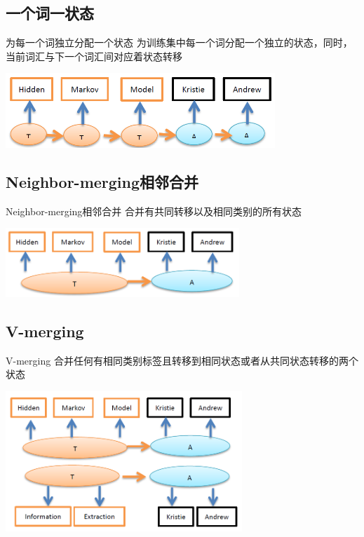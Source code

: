 \documentclass{beamer}
\begin{document}
\subsection{一个词一状态}
\begin{frame}{为每一个词独立分配一个状态}
    为训练集中每一个词分配一个独立的状态，同时，当前词汇与下一个词汇间对应着状态转移
    \begin{center}
        \includegraphics[height=80pt]{report5/neighbor-1.png}
    \end{center}
\end{frame}

\subsection{Neighbor-merging相邻合并}
\begin{frame}{Neighbor-merging相邻合并}
    合并有共同转移以及相同类别的所有状态
    \begin{center}
        \includegraphics[width=250pt]{report5/neighbor-2.png}
    \end{center}
\end{frame}

\subsection{V-merging}
\begin{frame}{V-merging}
    合并任何有相同类别标签且转移到相同状态或者从共同状态转移的两个状态
    \begin{center}
        \includegraphics[height=150pt]{report5/v-merge-1.png}
    \end{center}
\end{frame}
\end{document}
